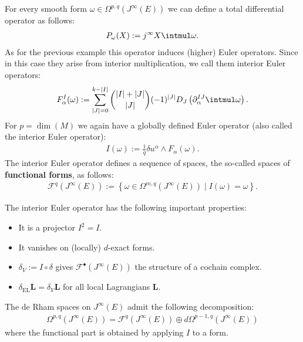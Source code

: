     \begin{example}
        For every smooth form $\omega\in\Omega^{p,q}(J^\infty(E))$ we can define a total differential operator as follows:
        \begin{gather}
            P_\omega(X) := j^\infty X\intmul\omega.
        \end{gather}
        As for the previous example this operator induces (higher) Euler operators. Since in this case they arise from interior multiplication, we call them interior Euler operators:
        \begin{gather}
            \label{var:interior_euler_operators}
            F^I_\alpha(\omega) := \sum_{|J|=0}^{k-|I|}\binom{|I|+|J|}{|J|}(-1)^{|J|}D_J\left(\partial^{IJ}_\alpha\intmul\omega\right).
        \end{gather}
        For $p=\dim(M)$ we again have a globally defined Euler operator (also called the interior Euler operator):
        \begin{gather}
            I(\omega) := \frac{1}{q}\delta u^\alpha\wedge F_\alpha(\omega).
        \end{gather}
        The interior Euler operator defines a sequence of spaces, the so-called spaces of \textbf{functional forms}, as follows:
        \begin{gather}
            \mathcal{F}^q(J^\infty(E)) := \left\{\omega\in\Omega^{m,q}(J^\infty(E))\mid I(\omega)=\omega\right\}.
        \end{gather}
    \end{example}
    \begin{property}
        The interior Euler operator has the following important properties:
        \begin{itemize}
            \item It is a projector $I^2=I$.
            \item It vanishes on (locally) $d$-exact forms.
            \item $\delta_V := I\circ\delta$ gives $\mathcal{F}^\bullet(J^\infty(E))$ the structure of a cochain complex.
            \item $\delta_{\text{EL}}\mathbf{L} = \delta_V\mathbf{L}$ for all local Lagrangians $\mathbf{L}$.
        \end{itemize}
    \end{property}
    \begin{property}\label{var:functional_decomposition}
        The de Rham spaces on $J^\infty(E)$ admit the following decomposition:
        \begin{gather}
            \Omega^{p,q}(J^\infty(E)) = \mathcal{F}^q(J^\infty(E))\oplus d\Omega^{p-1,q}(J^\infty(E))
        \end{gather}
        where the functional part is obtained by applying $I$ to a form.
    \end{property}

